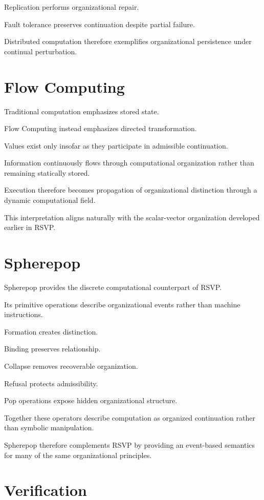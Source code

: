 \documentclass[11pt,oneside]{book}
\numberwithin{equation}{chapter}
\theoremstyle{definition}
\theoremstyle{plain}
\begin{document}
Replication performs organizational repair.

Fault tolerance preserves continuation despite partial failure.

Distributed computation therefore exemplifies organizational persistence
under continual perturbation.

\section{Flow Computing}

Traditional computation emphasizes stored state.

Flow Computing instead emphasizes directed transformation.

Values exist only insofar as they participate in admissible continuation.

Information continuously flows through computational organization rather
than remaining statically stored.

Execution therefore becomes propagation of organizational distinction
through a dynamic computational field.

This interpretation aligns naturally with the scalar-vector organization
developed earlier in RSVP.

\section{Spherepop}

Spherepop provides the discrete computational counterpart of RSVP.

Its primitive operations describe organizational events rather than
machine instructions.

Formation creates distinction.

Binding preserves relationship.

Collapse removes recoverable organization.

Refusal protects admissibility.

Pop operations expose hidden organizational structure.

Together these operators describe computation as organized continuation
rather than symbolic manipulation.

Spherepop therefore complements RSVP by providing an event-based semantics
for many of the same organizational principles.

\section{Verification}
\end{document}
